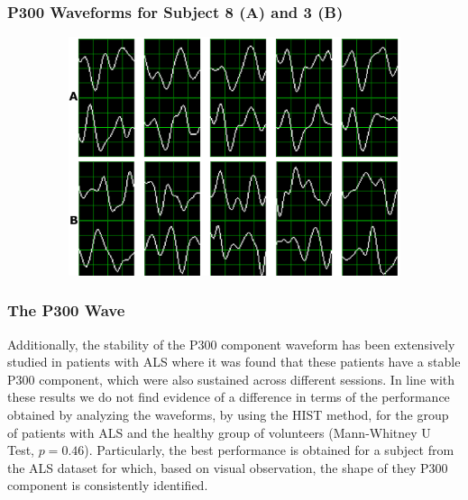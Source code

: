 \documentclass[aspectratio=169]{beamer}
\begin{document}
\begin{frame}
\frametitle{P300 Waveforms for Subject 8 (A) and 3 (B)}
\begin{center}
\begin{figure}[h!]
\centering
\includegraphics[height=7cm,width=1\textwidth]{images/subject.png}\label{subject8}
\label{fig:p300templates}
\end{figure}
\end{center}
\end{frame} 

\begin{frame}
\frametitle{The P300 Wave}
\begin{center}
Additionally, the stability of the P300 component waveform has been extensively studied in patients with ALS \cite{SellersandEmanuelDonchin2006,TomohiroMadarame2008,Nijboer2009,Mak2012,McCane2015} where it was found that these patients have a stable P300 component, which were also sustained across different sessions.  In line with these results we do not find evidence of a difference in terms of the performance obtained by analyzing the waveforms, by using the HIST method, for the group of patients with ALS and the healthy group of volunteers (Mann-Whitney U Test, $p=0.46$). Particularly, the best performance is obtained for a subject from the ALS dataset for which, based on visual observation, the shape of they P300 component is consistently identified.
\end{center}
\end{frame} 
    
\end{document}
